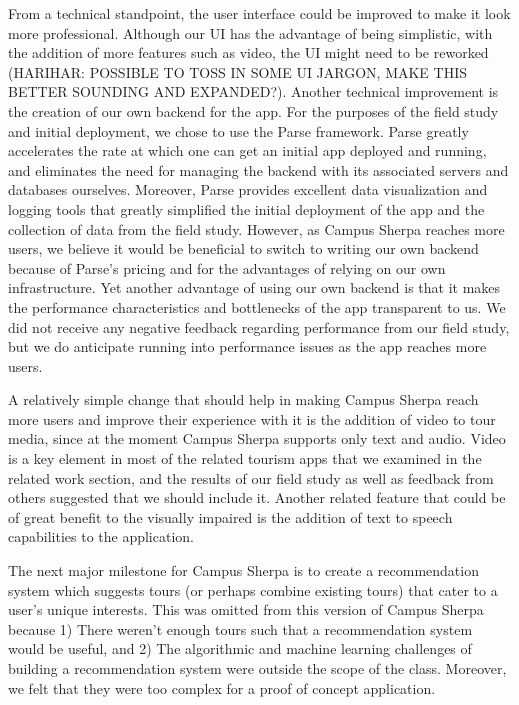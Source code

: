 \documentclass{sigchi}
\begin{document}
From a technical standpoint, the user interface could be improved to make it look more professional. Although our UI has the advantage of being simplistic, with the addition of more features such as video, the UI might need to be reworked (HARIHAR: POSSIBLE TO TOSS IN SOME UI JARGON, MAKE THIS BETTER SOUNDING AND EXPANDED?). Another technical improvement is the creation of our own backend for the app. For the purposes of the field study and initial deployment, we chose to use the Parse framework. Parse greatly accelerates the rate at which one can get an initial app deployed and running, and eliminates the need for managing the backend with its associated servers and databases ourselves. Moreover, Parse provides excellent data visualization and logging tools that greatly simplified the initial deployment of the app and the collection of data from the field study. However, as Campus Sherpa reaches more users, we believe it would be beneficial to switch to writing our own backend because of Parse's pricing and for the advantages of relying on our own infrastructure. Yet another advantage of using our own backend is that it makes the performance characteristics and bottlenecks of the app transparent to us. We did not receive any negative feedback regarding performance from our field study, but we do anticipate running into performance issues as the app reaches more users. 

A relatively simple change that should help in making Campus Sherpa reach more users and improve their experience with it is the addition of video to tour media, since at the moment Campus Sherpa supports only text and audio. Video is a key element in most of the related tourism apps that we examined in the related work section, and the results of our field study as well as feedback from others suggested that we should include it. Another related feature that could be of great benefit to the visually impaired is the addition of text to speech capabilities to the application. 

The next major milestone for Campus Sherpa is to create a recommendation system which suggests tours (or perhaps combine existing tours) that cater to a user's unique interests. This was omitted from this version of Campus Sherpa because 1) There weren't enough tours such that a recommendation system would be useful, and 2) The algorithmic and machine learning challenges of building a recommendation system were outside the scope of the class. Moreover, we felt that they were too complex for a proof of concept application. 
\end{document}
